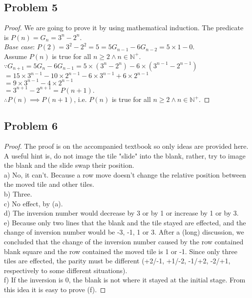 \documentclass{article}
\begin{document}
\subsection{Problem 5}
\begin{proof}
We are going to prove it by using mathematical induction. The predicate is $P(n)=G_n=3^n - 2^n$.
\\ \textit{Base case}: $P(2) = 3^2 - 2^2 = 5 = 5G_{n-1} - 6G_{n-2} = 5 \times 1 - 0$.
\\ Assume $P(n)$ is true for all $n \geq 2 \wedge n \in \mathbb{N}^+$.
\\ $ \because G_{n+1} = 5G_{n} - 6G_{n-1} = 5 \times (3^n - 2^n) - 6 \times (3^{n-1} - 2^{n-1})$
\\ $ = 15 \times 3^{n-1} - 10 \times 2^{n-1} - 6 \times 3^{n-1} + 6 \times 2^{n-1}
$
\\ $ = 9 \times 3^{n-1} - 4 \times 2^{n-1} $
\\ $ = 3^{n + 1} - 2^{n + 1} = P(n+1)$.
\\ $ \therefore P(n) \implies P(n+1)$, i.e. $P(n)$ is true for all $n \geq 2 \wedge n \in \mathbb{N}^+$.
\end{proof}
\subsection{Problem 6}
\begin{proof} The proof is on the accompanied textbook so only ideas are provided here. A useful hint is, do not image the tile "slide" into the blank, rather, try to image the blank and the slide swap their position.
\\ a) No, it can't. Because a row move doesn't change the relative position between the moved tile and other tiles.
\\ b) Three.
\\ c) No effect, by (a).
\\ d) The inversion number would decrease by 3 or by 1 or increase by 1 or by 3.
\\ e) Because only two lines that the blank and the tile stayed are effected, and the change of inversion number would be -3, -1, 1 or 3. After a (long) discussion, we concluded that the change of the inversion number caused by the row contained blank square and the row contained the moved tile is 1 or -1. Since only three tiles are effected, the parity must be different (+2/-1, +1/-2, -1/+2, -2/+1, respectively to some different situations).
\\ f) If the inversion is 0, the blank is not where it stayed at the initial stage. From this idea it is easy to prove (f).
\end{proof}
\end{document}
